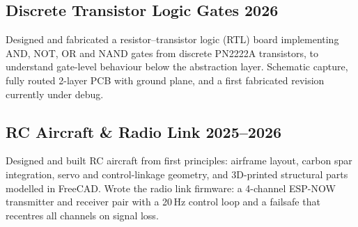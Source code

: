 \documentclass[10pt,a4paper]{article}
\begin{document}
\subsection*{Discrete Transistor Logic Gates \hfill 2026}
Designed and fabricated a resistor--transistor logic (RTL) board implementing
AND, NOT, OR and NAND gates from discrete PN2222A transistors, to understand
gate-level behaviour below the abstraction layer. Schematic capture, fully
routed 2-layer PCB with ground plane, and a first fabricated revision currently
under debug.

\subsection*{RC Aircraft \& Radio Link \hfill 2025--2026}
Designed and built RC aircraft from first principles: airframe layout, carbon
spar integration, servo and control-linkage geometry, and 3D-printed structural
parts modelled in FreeCAD. Wrote the radio link firmware: a 4-channel ESP-NOW
transmitter and receiver pair with a 20\,Hz control loop and a failsafe that
recentres all channels on signal loss.
\end{document}
